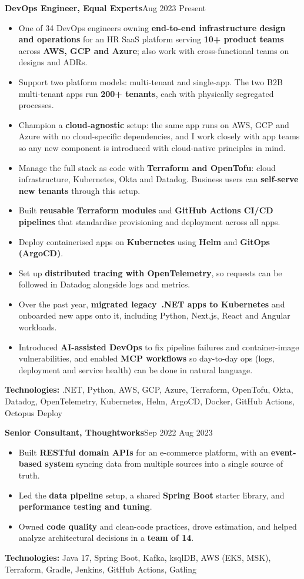 \documentclass[10pt,a4paper]{article}
\newcommand{\entry}[2]{\textbf{#1}\hfill{\small\color{dim}#2}\par\vspace{1pt}}
\newcommand{\tech}[1]{{\small\color{dim}\textbf{Technologies:} #1}\par}
\begin{document}
\entry{DevOps Engineer, Equal Experts}{Aug 2023 \textendash{} Present}
\begin{itemize}
  \item One of 3\textendash{}4 DevOps engineers owning \textbf{end-to-end infrastructure design and operations} for an HR SaaS platform serving \textbf{10+ product teams} across \textbf{AWS, GCP and Azure}; also work with cross-functional teams on designs and ADRs.
  \item Support two platform models: multi-tenant and single-app. The two B2B multi-tenant apps run \textbf{200+ tenants}, each with physically segregated processes.
  \item Champion a \textbf{cloud-agnostic} setup: the same app runs on AWS, GCP and Azure with no cloud-specific dependencies, and I work closely with app teams so any new component is introduced with cloud-native principles in mind.
  \item Manage the full stack as code with \textbf{Terraform and OpenTofu}: cloud infrastructure, Kubernetes, Okta and Datadog. Business users can \textbf{self-serve new tenants} through this setup.
  \item Built \textbf{reusable Terraform modules} and \textbf{GitHub Actions CI/CD pipelines} that standardise provisioning and deployment across all apps.
  \item Deploy containerised apps on \textbf{Kubernetes} using \textbf{Helm} and \textbf{GitOps (ArgoCD)}.
  \item Set up \textbf{distributed tracing with OpenTelemetry}, so requests can be followed in Datadog alongside logs and metrics.
  \item Over the past year, \textbf{migrated legacy~.NET apps to Kubernetes} and onboarded new apps onto it, including Python, Next.js, React and Angular workloads.
  \item Introduced \textbf{AI-assisted DevOps} to fix pipeline failures and container-image vulnerabilities, and enabled \textbf{MCP workflows} so day-to-day ops (logs, deployment and service health) can be done in natural language.
\end{itemize}
\tech{.NET, Python, AWS, GCP, Azure, Terraform, OpenTofu, Okta, Datadog, OpenTelemetry, Kubernetes, Helm, ArgoCD, Docker, GitHub Actions, Octopus Deploy}

\vspace{6pt}
\entry{Senior Consultant, Thoughtworks}{Sep 2022 \textendash{} Aug 2023}
\begin{itemize}
  \item Built \textbf{RESTful domain APIs} for an e-commerce platform, with an \textbf{event-based system} syncing data from multiple sources into a single source of truth.
  \item Led the \textbf{data pipeline} setup, a shared \textbf{Spring Boot} starter library, and \textbf{performance testing and tuning}.
  \item Owned \textbf{code quality} and clean-code practices, drove estimation, and helped analyze architectural decisions in a \textbf{team of 14}.
\end{itemize}
\tech{Java 17, Spring Boot, Kafka, ksqlDB, AWS (EKS, MSK), Terraform, Gradle, Jenkins, GitHub Actions, Gatling}
\end{document}
